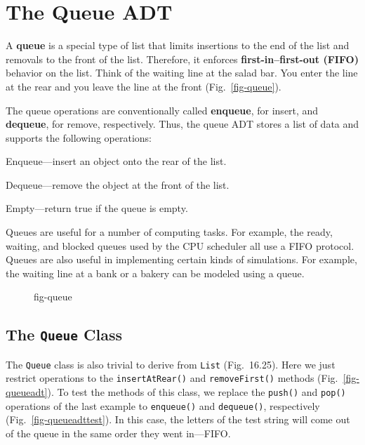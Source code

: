 \section{The {Queue} ADT}
\noindent A {\bf queue} is a special type of list that
limits insertions to the end of the list and removals to the front of
the list.  Therefore, it enforces {\bf first-in--first-out
(FIFO)} behavior on the list.  Think
of the waiting line at the salad bar.  You enter the line at the rear
and you leave the line at the front (Fig.~\ref{fig-queue}).  

\begin{minipage}{27pc}
The queue operations are conventionally called {\bf
enqueue}, for insert, and {\bf dequeue},
for remove, respectively.  Thus, the queue ADT stores a list of data
and supports the following operations:

\begin{BL}
\item  Enqueue---insert an object onto the rear of the list.
\item  Dequeue---remove the object at the front of the list.
\item  Empty---return true if the queue is empty.
\end{BL}
\end{minipage}

Queues are useful for a number of computing tasks.  For example, the
ready, waiting, and blocked queues used by the CPU scheduler all use a
FIFO protocol.   Queues are also useful in implementing certain kinds
of simulations.  For example, the waiting line at a bank or a bakery
can be modeled using a queue.

\begin{figure}[h!]
{fig-queue}
\end{figure}

\pagebreak
\subsection{The {\tt Queue} Class}

\noindent The {\tt Queue} class is also trivial to derive
from {\tt List} (Fig.~16.25).  Here we just restrict operations to
the {\tt insertAtRear()} and {\tt removeFirst()} methods
(Fig.~\ref{fig-queueadt}).  To test the methods of this class, we
replace the {\tt push()} and {\tt pop()} operations of 
the last example to {\tt enqueue()} and {\tt dequeue()}, respectively
(Fig.~\ref{fig-queueadttest}).  In this case, the letters of the test
string will come out of the queue in the same order they went
in---FIFO.

